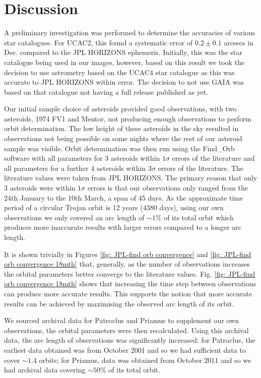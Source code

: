 \documentclass[10pt, twocolumn]{revtex4}    %
\begin{document}
\section{Discussion}

A preliminary investigation was performed to determine the accuracies of various star catalogues. For UCAC2, this found a systematic error of $0.2\pm0.1$ arcsecs in Dec. compared to the JPL HORIZONS ephemeris. Initially, this was the star catalogue being used in our images, however, based on this result we took the decision to use astrometry based on the UCAC4 star catalogue as this was accurate to JPL HORIZONS within error. The decision to not use GAIA was based on that catalogue not having a full release published as yet. 

Our initial sample choice of asteroids provided good observations, with two asteroids, 1974 FV1 and Mentor, not producing enough observations to perform orbit determination. The low height of these asteroids in the sky resulted in observations not being possible on some nights where the rest of our asteroid sample was visible. Orbit determination was then run using the Find\_Orb software with all parameters for 3 asteroids within $1\sigma$ errors of the literature and all parameters for a further 4 asteroids within $3\sigma$ errors of the literature. The literature values were taken from JPL HORIZONS. The primary reason that only 3 asteroids were within $1\sigma$ errors is that our observations only ranged from the 24th January to the 10th March, a span of 45 days. As the approximate time period of a circular Trojan orbit is 12 years (4380 days), using our own observations we only covered an arc length of ${\sim}1\%$ of its total orbit which produces more inaccurate results with larger errors compared to a longer arc length.

It is shown trivially in Figures \ref{fig: JPL-find orb convergence} and \ref{fig: JPL-find orb convergence 18mth} that, generally, as the number of observations increases the orbital parameters better converge to the literature values. Fig. \ref{fig: JPL-find orb convergence 18mth} shows that increasing the time step between observations can produce more accurate results. This supports the notion that more accurate results can be achieved by maximising the observed arc length of its orbit.

We sourced archival data for Patroclus and Priamus to supplement our own observations, the orbital parameters were then recalculated. Using this archival data, the arc length of observations was significantly increased: for Patroclus, the earliest data obtained was from October 2001 and so we had sufficient data to cover ${\sim}1.4$ orbits; for Priamus, data was obtained from October 2011 and so we had archival data covering ${\sim}50\%$ of its total orbit.
\end{document}
